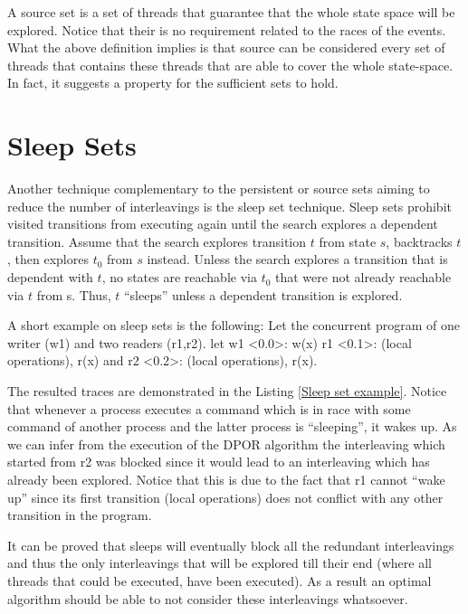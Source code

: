 A source set is a set of threads that guarantee that the whole state space will be explored. 
Notice that their is no requirement related to the races of the events.
What the above definition implies is that source can be considered every set of threads that contains these threads 
that are able to cover the whole state-space.
In fact, it suggests a property for the sufficient sets to hold.

\section{Sleep Sets}

Another technique complementary to the persistent or source sets aiming to reduce the number of interleavings is the sleep set technique.
Sleep sets prohibit visited transitions from executing again
until the search explores a dependent transition. Assume that
the search explores transition $t$ from state $s$, backtracks $t$,
then explores $t_0$ from $s$ instead. Unless the search explores
a transition that is dependent with $t$, no states are reachable
via $t_0$ that were not already reachable via $t$ from s. Thus, $t$
“sleeps” unless a dependent transition is explored.

A short example on sleep sets is the following:
Let the concurrent program of one writer (w1) and two readers (r1,r2).
let w1 <0.0>: w(x) r1 <0.1>: (local operations), r(x) and r2 <0.2>: (local operations), r(x).

The resulted traces are demonstrated in the Listing \ref{Sleep set example}. Notice that whenever a process executes a command 
which is in race with some command of another process and the latter process is ``sleeping'', it wakes up. 
As we can infer from the execution of the DPOR algorithm the interleaving which started from r2 was blocked since it would lead to an interleaving which
has already been explored. Notice that this is due to the fact that r1 cannot ``wake up'' since its first transition (local operations) does not conflict with any other transition
in the program. 

It can be proved \cite{Godefroid1996} that sleeps will eventually block all the redundant interleavings and thus the only interleavings that will be explored till their end (where all threads that could be executed, have been executed).
As a result an optimal algorithm should be able to not consider these interleavings whatsoever.


